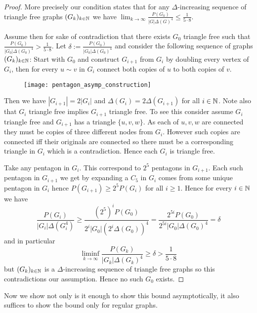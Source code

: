 \begin{proof}
    More precisely our condition states that for any $\Delta$-increasing sequence of
    triangle free graphs $(G_k)_{k\in\mathbb{N}}$ we have
    $\lim_{k\to\infty} \frac{P(G_k)}{|G|\Delta(G)^4} \leq \frac{1}{5\cdot 8}$.

    Assume then for sake of contradiction that there exists $G_0$ triangle free
    such that $\frac{P(G_0)}{|G_0|\Delta(G_0)^4} > \frac{1}{5\cdot 8}$.
    Let $\delta := \frac{P(G_0)}{|G_0|\Delta(G_0)^4}$ and consider the following
    sequence of graphs $(G_k)_{k\in\mathbb{N}}$: Start with $G_0$ and construct
    $G_{i+1}$ from $G_i$ by doubling every vertex of $G_i$, then for every
    $u\sim v$ in $G_i$ connect both copies of $u$ to both copies of $v$.

    \begin{figure}[!ht]
        \centering
        \texttt{[image: pentagon\_asymp\_construction]}
    \end{figure}

    Then we have $|G_{i+1}| = 2|G_i|$ and $\Delta(G_i) = 2\Delta(G_{i+1})$ for all
    $i\in\mathbb{N}$. Note also that $G_i$ triangle free implies $G_{i+1}$ triangle free.
    To see this consider assume $G_i$ triangle free and $G_{i+1}$ has a triangle
    $\{u, v, w\}$. As each of $u,v,w$ are connected they must be copies of three
    different nodes from $G_i$. However such copies are connected iff their originals are
    connected so there must be a corresponding triangle in $G_i$ which is a contradiction.
    Hence each $G_i$ is triangle free.

    Take any pentagon in $G_i$. This correspond to $2^5$ pentagons in $G_{i+1}$. Each
    such pentagon in $G_{i+1}$ we get by expanding a $C_5$ in $G_i$ comes from
    some unique pentagon in $G_i$ hence $P(G_{i+1}) \geq 2^5P(G_i)$ for all $i\geq 1$.
    Hence for every $i\in\mathbb{N}$ we have
    \[
        \frac{P(G_i)}{|G_i|\Delta(G_i^4)} \geq
        \frac{(2^5)^i P(G_0)}{2^i|G_0|(2^i\Delta(G_0))^4}
        = \frac{2^{5i} P(G_0)}{2^{5i}|G_0|\Delta(G_0)^4}
        = \delta
    \]
    and in particular
    \[
        \liminf_{k\to\infty}\frac{P(G_k)}{|G_k|\Delta(G_k)^4}
        \geq \delta > \frac{1}{5\cdot 8}
    \]
    but $(G_k)_{k\in\mathbb{N}}$ is a $\Delta$-increasing sequence of triangle free graphs
    so this contradictions our assumption. Hence no such $G_0$ exists.
\end{proof}

Now we show not only is it enough to show this bound asymptotically, it also suffices
to show the bound only for regular graphs.

